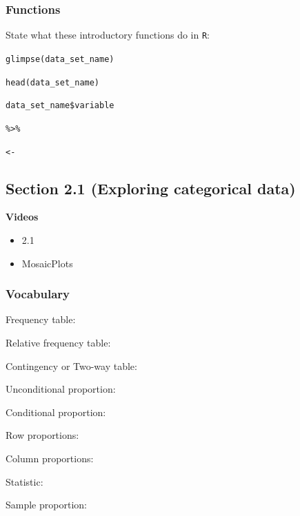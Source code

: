 \documentclass[
]{report}
\providecommand{\tightlist}{%
  \setlength{\itemsep}{0pt}\setlength{\parskip}{0pt}}
\newcommand{\rgs}{\vspace{12pt}} %
\newcommand{\rgi}{\hspace{24pt}}  %
\begin{document}
\hypertarget{functions}{%
\subsubsection*{Functions}\label{functions}}

State what these introductory functions do in \texttt{R}:

\texttt{glimpse(data\_set\_name)}

\texttt{head(data\_set\_name)}

\texttt{data\_set\_name\$variable}

\texttt{\%\textgreater{}\%}

\texttt{\textless{}-}

\hypertarget{section-2.1-exploring-categorical-data}{%
\subsection*{Section 2.1 (Exploring categorical data)}\label{section-2.1-exploring-categorical-data}}


\textbf{Videos}

\begin{itemize}
\tightlist
\item
  2.1
\item
  MosaicPlots
\end{itemize}


\hypertarget{vocabulary-3}{%
\subsubsection*{Vocabulary}\label{vocabulary-3}}

Frequency table:
\rgs

Relative frequency table:
\rgs

Contingency or Two-way table:
\rgs

Unconditional proportion:
\rgs

Conditional proportion:
\rgs

\rgi Row proportions:
\rgs

\rgi Column proportions:
\rgs

Statistic:
\rgs

\rgi Sample proportion:
\rgs
\end{document}
